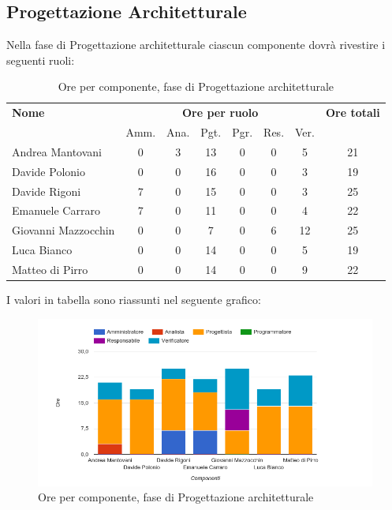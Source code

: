 \pagebreak
\subsection{Progettazione Architetturale}
Nella fase di Progettazione architetturale ciascun componente dovrà rivestire i seguenti ruoli:

\begin{table}[H]
\begin{tabular}{lccccccc}
\toprule
    \textbf{Nome}  & \multicolumn{6}{c}{\textbf{Ore per ruolo}} & \textbf{Ore totali} \\
     & Amm. & Ana. & Pgt. & Pgr. & Res. & Ver. & \\
    \midrule
    
	   Andrea Mantovani & 0 & 3 & 13 & 0 & 0 & 5 & 21 \\
         Davide Polonio & 0 & 0 & 16 & 0 & 0 & 3 & 19 \\
       	  Davide Rigoni & 7 & 0 & 15 & 0 & 0 & 3 & 25 \\
	   Emanuele Carraro & 7 & 0 & 11 & 0 & 0 & 4 & 22 \\
	Giovanni Mazzocchin & 0 & 0 & 7 & 0 & 6 & 12 & 25 \\
	        Luca Bianco & 0 & 0 & 14 & 0 & 0 & 5 & 19 \\
      	Matteo di Pirro & 0 & 0 & 14 & 0 & 0 & 9 & 22 \\
    
    \bottomrule
\end{tabular}
\caption{Ore per componente, fase di Progettazione architetturale}
\end{table}

I valori in tabella sono riassunti nel seguente grafico: \\ 

    \begin{figure}[H]
      \begin{center}
        \includegraphics[width=12cm]{res/img/orePerComponenteProgettazioneArchitetturale.png}
      \caption{Ore per componente, fase di Progettazione architetturale}
      \end{center} 
    \end{figure}    
    
